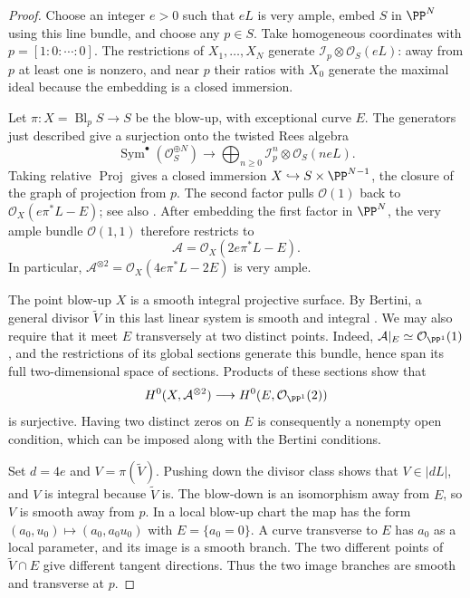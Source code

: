 \begin{proof}
Choose an integer $e>0$ such that $eL$ is very ample, embed $S$ in
$\PP^N$ using this line bundle, and choose any $p\in S$.  Take homogeneous
coordinates with $p=[1:0:\cdots:0]$.  The restrictions of $X_1,\ldots,X_N$
generate $\mathcal I_p\otimes\mathcal O_S(eL)$: away from $p$ at least one
is nonzero, and near $p$ their ratios with $X_0$ generate the maximal ideal
because the embedding is a closed immersion.

Let $\pi:X=\operatorname{Bl}_pS\to S$ be the blow-up, with exceptional
curve $E$.  The generators just described give a surjection onto the
twisted Rees algebra
\[
 \operatorname{Sym}^{\bullet}(\mathcal O_S^{\oplus N})
 \longrightarrow
 \bigoplus_{n\ge0}\mathcal I_p^n\otimes\mathcal O_S(neL).
\]
Taking relative $\operatorname{Proj}$ gives a closed immersion
$X\hookrightarrow S\times\PP^{N-1}$, the closure of the graph of projection from $p$.
The second factor pulls $\mathcal O(1)$ back to
$\mathcal O_X(e\pi^*L-E)$; see also \cite[Tag 01OF]{Stacks}.
After embedding the first factor in $\PP^N$, the very ample bundle
$\mathcal O(1,1)$ therefore restricts to
\[
 \mathcal A=\mathcal O_X(2e\pi^*L-E).
\]
In particular, $\mathcal A^{\otimes2}=\mathcal O_X(4e\pi^*L-2E)$ is
very ample.

The point blow-up $X$ is a smooth integral projective surface.  By
Bertini, a general divisor $\widetilde V$ in this last linear system
is smooth and integral \cite[Tags 0FD6 and 0G4F]{Stacks}.  We may also
require that it meet $E$ transversely at two distinct points.  Indeed,
$\mathcal A|_E\simeq\mathcal O_{\PP^1}(1)$, and the restrictions of its
global sections generate this bundle, hence span its full two-dimensional
space of sections.  Products of these sections show that
\[
 H^0(X,\mathcal A^{\otimes2})
 \longrightarrow H^0(E,\mathcal O_{\PP^1}(2))
\]
is surjective.  Having two distinct zeros on $E$ is consequently a
nonempty open condition, which can be imposed along with the Bertini
conditions.

Set $d=4e$ and $V=\pi(\widetilde V)$.  Pushing down the divisor class
shows that $V\in|dL|$, and $V$ is integral because $\widetilde V$ is.
The blow-down is an isomorphism away from $E$, so $V$ is smooth away
from $p$.  In a local blow-up chart the map has the form
$(a_0,u_0)\mapsto(a_0,a_0u_0)$ with $E=\{a_0=0\}$.
A curve transverse to $E$ has $a_0$ as a local parameter, and its image
is a smooth branch.  The two different points of $\widetilde V\cap E$
give different tangent directions.  Thus the two image branches are
smooth and transverse at $p$.
\end{proof}

